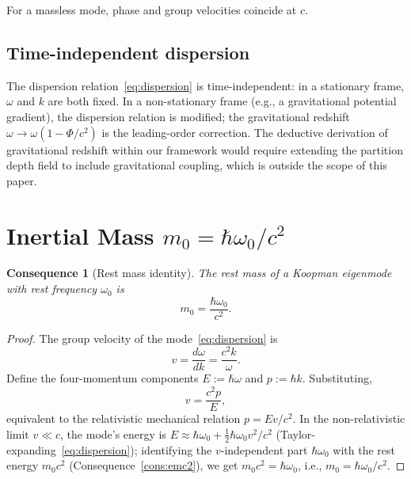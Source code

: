 \documentclass[11pt,twocolumn,a4paper]{article}
\theoremstyle{axiomstyle}
\theoremstyle{conseqstyle}
\newtheorem{consequence}{Consequence}
\theoremstyle{definition}
\theoremstyle{remark}
\begin{document}
For a massless mode, phase and group velocities coincide at $c$.

\subsection{Time-independent dispersion}

The dispersion relation~\eqref{eq:dispersion} is time-independent: in a stationary frame, $\omega$ and $k$ are both fixed. In a non-stationary frame (e.g., a gravitational potential gradient), the dispersion relation is modified; the gravitational redshift $\omega\to\omega(1-\Phi/c^{2})$ is the leading-order correction. The deductive derivation of gravitational redshift within our framework would require extending the partition depth field to include gravitational coupling, which is outside the scope of this paper.

\section{Inertial Mass $m_{0}=\hbar\omega_{0}/c^{2}$}
\label{sec:restmass}

\begin{consequence}[Rest mass identity]
\label{cons:restmass}
The rest mass of a Koopman eigenmode with rest frequency $\omega_{0}$ is
\begin{equation}
m_{0}=\frac{\hbar\omega_{0}}{c^{2}}.
\label{eq:restmass}
\end{equation}
\end{consequence}

\begin{proof}
The group velocity of the mode~\eqref{eq:dispersion} is
\begin{equation*}
v=\frac{d\omega}{dk}=\frac{c^{2}k}{\omega}.
\end{equation*}
Define the four-momentum components $E:=\hbar\omega$ and $p:=\hbar k$. Substituting,
\begin{equation*}
v=\frac{c^{2}p}{E},
\end{equation*}
equivalent to the relativistic mechanical relation $p=Ev/c^{2}$. In the non-relativistic limit $v\ll c$, the mode's energy is $E\approx\hbar\omega_{0}+\tfrac{1}{2}\hbar\omega_{0}v^{2}/c^{2}$ (Taylor-expanding~\eqref{eq:dispersion}); identifying the $v$-independent part $\hbar\omega_{0}$ with the rest energy $m_{0}c^{2}$ (Consequence~\ref{cons:emc2}), we get $m_{0}c^{2}=\hbar\omega_{0}$, i.e., $m_{0}=\hbar\omega_{0}/c^{2}$.
\end{proof}
\end{document}
